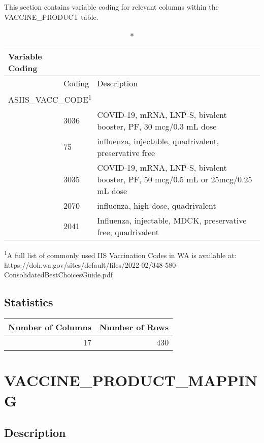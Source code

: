 \documentclass[
  letterpaper,
  DIV=11,
  numbers=noendperiod]{scrreprt}
\begin{document}
This section contains variable coding for relevant columns within the
VACCINE\_PRODUCT table.

\setlength{\LTpost}{0mm}
\begin{longtable}{l|ll}
\caption*{
{\large Variable Coding}
} \\ 
\toprule
\multicolumn{1}{l}{} & Coding & Description \\ 
\midrule
\multicolumn{3}{l}{ASIIS\_VACC\_CODE\textsuperscript{1}} \\ 
\midrule
  & 3036 & COVID-19, mRNA, LNP-S, bivalent booster, PF, 30 mcg/0.3 mL dose \\ 
  & 75 & influenza, injectable, quadrivalent, preservative free \\ 
  & 3035 & COVID-19, mRNA, LNP-S, bivalent booster, PF, 50 mcg/0.5 mL or 25mcg/0.25 mL dose \\ 
  & 2070 & influenza, high-dose, quadrivalent \\ 
  & 2041 & Influenza, injectable, MDCK, preservative free, quadrivalent \\ 
\bottomrule
\end{longtable}
\begin{minipage}{\linewidth}
\textsuperscript{1}A full list of commonly used IIS Vaccination Codes in WA is available at: https://doh.wa.gov/sites/default/files/2022-02/348-580-ConsolidatedBestChoicesGuide.pdf\\
\end{minipage}

\hypertarget{statistics-49}{%
\section*{Statistics}\label{statistics-49}}

\begin{longtable}{rr}
\toprule
Number of Columns & Number of Rows \\ 
\midrule
17 & 430 \\ 
\bottomrule
\end{longtable}

\hypertarget{vaccine_product_mapping}{%
\chapter*{VACCINE\_PRODUCT\_MAPPING}\label{vaccine_product_mapping}}

\hypertarget{description-50}{%
\section*{Description}\label{description-50}}
\end{document}
